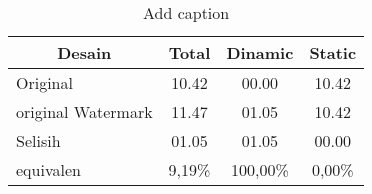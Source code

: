 \chapter{\babEmpat}
\begin{table}[htbp]
	\centering
	\caption{Add caption}
	\begin{tabular}{|l|c|c|c|}
		\hline
		\multicolumn{1}{|c|}{Desain} & Total & Dinamic & Static \bigstrut\\
		\hline
		Original & 10.42 & 00.00 & 10.42 \bigstrut\\
		\hline
		original Watermark & 11.47 & 01.05 & 10.42 \bigstrut\\
		\hline
		Selisih & 01.05 & 01.05 & 00.00 \bigstrut\\
		\hline
		equivalen & 9,19\% & 100,00\% & 0,00\% \bigstrut\\
		\hline
	\end{tabular}%
	\label{tab:addlabel}%
\end{table}%


